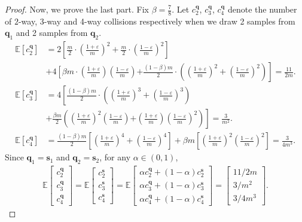 \documentclass[10pt]{article} %
\def\eps{{\varepsilon}}
\newcommand{\E}{\mathbb{E}}
\theoremstyle{plain}
\newcommand{\bq}{\textbf{q}}
\newcommand{\bs}{\textbf{s}}
\begin{document}
\begin{proof}
	Now, we prove the last part. Fix $\beta = \frac78$. Let $c_2^{\bq}$, $c_3^{\bq}$, $c_4^{\bq}$ denote the number of $2$-way, 3-way and 4-way collisions respectively when we draw 2 samples from $\bq_1$ and 2 samples from $\bq_2$. %
	\begingroup
	\allowdisplaybreaks
	\begin{align*}
		\E[c_2^{\bq}] &= 2 \left[ \frac{m}{2} \cdot \left(\frac{1+\eps}{m}\right)^2 + \frac{m}{2} \cdot \left(\frac{1-\eps}{m}\right)^2\right] \\
		&+4\left[ \beta m \cdot \left(\frac{1+\eps}{m}\right)\left(\frac{1-\eps}{m}\right) \right. 
		\left.+\frac{(1-\beta)m}{2}\cdot \left(\left(\frac{1+\eps}{m}\right)^2 + \left(\frac{1-\eps}{m}\right)^2 \right) \right] 
		= \frac{11}{2m}. \\
		\E[c_3^{\bq}] &= 4 \left[ \frac{(1-\beta)m}{2}\cdot \left ( \left(\frac{1+\eps}{m}\right)^3 + \left(\frac{1-\eps}{m}\right)^3  \right) \right. \\
		&\left.+ \frac{\beta m}{2}\left ( \left(\frac{1+\eps}{m}\right)^2  \left(\frac{1-\eps}{m}\right)  \right.\right.\left.\left.+ \left(\frac{1+\eps}{m}\right)  \left(\frac{1-\eps}{m}\right)^2\right)\right] 
		= \frac{3}{m^2}. \\
		\E[c_4^{\bq}] &= \frac{(1-\beta)m}{2}\left [ \left(\frac{1+\eps}{m}\right)^4 + \left(\frac{1-\eps}{m}\right)^4 \right] + \beta m \left [ \left(\frac{1+\eps}{m}\right)^2\left(\frac{1-\eps}{m}\right)^2 \right] 
		= \frac{3}{4m^3}.
	\end{align*}
	\endgroup
	Since $\bq_1 = \bs_1$ and $\bq_2 = \bs_2$, for any $\alpha \in (0,1)$,
	\begin{align}
		\label{eqn:means-q-s}
		\E\begin{bmatrix} c_2^{\bq} \\ c_3^{\bq} \\ c_4^{\bq}\end{bmatrix} = \E\begin{bmatrix} c_2^{\bs} \\ c_3^{\bs} \\ c_4^{\bs}\end{bmatrix} = \E\begin{bmatrix} \alpha c_2^{\bq} + (1-\alpha) c_2^{\bs} \\ \alpha c_3^{\bq} + (1-\alpha) c_3^{\bs} \\ \alpha c_4^{\bq} + (1-\alpha) c_4^{\bs}\end{bmatrix} = \begin{bmatrix} 11/2m \\ 3/m^2 \\ 3/4m^3\end{bmatrix}.

\end{align}
\end{proof}
\end{document}
